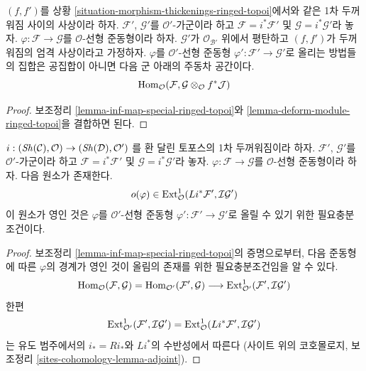 \begin{lemma}
\label{lemma-inf-map-rel-ringed-topoi}
$(f, f')$를 상황 \ref{situation-morphism-thickenings-ringed-topoi}에서와
같은 1차 두꺼워짐 사이의 사상이라 하자. $\mathcal{F}'$,
$\mathcal{G}'$를 $\mathcal{O}'$-가군이라 하고
$\mathcal{F} = i^*\mathcal{F}'$ 및 $\mathcal{G} = i^*\mathcal{G}'$라
놓자. $\varphi : \mathcal{F} \to \mathcal{G}$를 $\mathcal{O}$-선형
준동형이라 하자. $\mathcal{G}'$가 $\mathcal{O}_{\mathcal{B}'}$ 위에서
평탄하고 $(f, f')$가 두꺼워짐의 엄격 사상이라고 가정하자.
$\varphi$를 $\mathcal{O}'$-선형 준동형
$\varphi' : \mathcal{F}' \to \mathcal{G}'$로 올리는 방법들의 집합은
공집합이 아니면 다음 군 아래의 주동차 공간이다.
$$
\mathop{\mathrm{Hom}}\nolimits_\mathcal{O}(\mathcal{F},
\mathcal{G} \otimes_\mathcal{O} f^*\mathcal{J})
$$
\end{lemma}

\begin{proof}
보조정리 \ref{lemma-inf-map-special-ringed-topoi}와
\ref{lemma-deform-module-ringed-topoi}을 결합하면 된다.
\end{proof}

\begin{lemma}
\label{lemma-inf-obs-map-special-ringed-topoi}
$i : (\mathop{\mathit{Sh}}\nolimits(\mathcal{C}), \mathcal{O}) \to (\mathop{\mathit{Sh}}\nolimits(\mathcal{D}), \mathcal{O}')$
를 환 달린 토포스의 1차 두꺼워짐이라 하자. $\mathcal{F}'$,
$\mathcal{G}'$를 $\mathcal{O}'$-가군이라 하고
$\mathcal{F} = i^*\mathcal{F}'$ 및 $\mathcal{G} = i^*\mathcal{G}'$라
놓자. $\varphi : \mathcal{F} \to \mathcal{G}$를 $\mathcal{O}$-선형
준동형이라 하자. 다음 원소가 존재한다.
$$
o(\varphi) \in
\mathop{\mathrm{Ext}}\nolimits^1_\mathcal{O}(Li^*\mathcal{F}', \mathcal{I}\mathcal{G}')
$$
이 원소가 영인 것은 $\varphi$를 $\mathcal{O}'$-선형 준동형
$\varphi' : \mathcal{F}' \to \mathcal{G}'$로 올릴 수 있기 위한
필요충분조건이다.
\end{lemma}

\begin{proof}
보조정리 \ref{lemma-inf-map-special-ringed-topoi}의 증명으로부터, 다음
준동형에 따른 $\varphi$의 경계가 영인 것이 올림의 존재를 위한
필요충분조건임을 알 수 있다.
$$
\mathop{\mathrm{Hom}}\nolimits_\mathcal{O}(\mathcal{F}, \mathcal{G}) =
\mathop{\mathrm{Hom}}\nolimits_{\mathcal{O}'}(\mathcal{F}', \mathcal{G}) \longrightarrow
\mathop{\mathrm{Ext}}\nolimits^1_{\mathcal{O}'}(\mathcal{F}', \mathcal{I}\mathcal{G}')
$$
한편
$$
\mathop{\mathrm{Ext}}\nolimits^1_{\mathcal{O}'}(\mathcal{F}', \mathcal{I}\mathcal{G}') =
\mathop{\mathrm{Ext}}\nolimits^1_\mathcal{O}(Li^*\mathcal{F}', \mathcal{I}\mathcal{G}')
$$
는 유도 범주에서의 $i_* = Ri_*$와 $Li^*$의 수반성에서 따른다
(사이트 위의 코호몰로지, 보조정리
\ref{sites-cohomology-lemma-adjoint}).
\end{proof}

